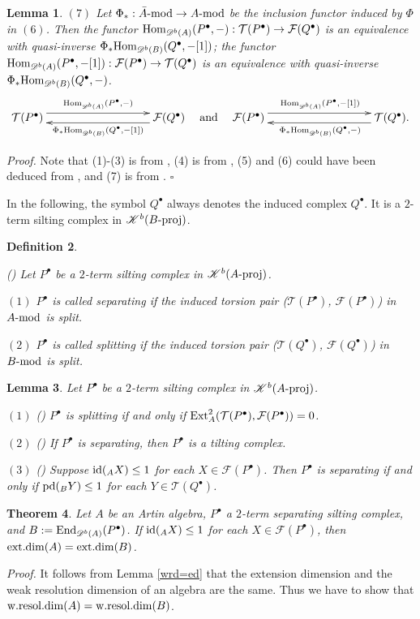 \documentclass[12pt]{article}
\numberwithin{equation}{section}
\newtheorem{Def}{Definition}[section]
\newtheorem{Theo}[Def]{Theorem}
\newtheorem{Lem}[Def]{Lemma}
\theoremstyle{definition}
\newcommand{\End}{{\rm End}}
\def\ed{\mathop{\rm ext.dim}\nolimits}
\def\wrd{\mathop{\rm w.resol.dim}\nolimits}
\newcommand{\pd}{{\rm pd}}
\newcommand{\id}{{\rm id}}
\newcommand{\F}{{\mathcal F}}
\newcommand{\T}{{\mathcal T}}
\newcommand{\Db}[1]{{\mathscr D}^b(#1)}
\newcommand{\Kb}[1]{{\mathscr K}^b(#1)}
\newcommand{\modcat}{\ensuremath{\mbox{{\rm -mod}}}}
\newcommand{\pmodcat}[1]{#1\mbox{{\rm -proj}}}
\newcommand{\Hom}{{\rm Hom}}
\newcommand{\Ext}{{\rm Ext}}
\newcommand{\ra}{\rightarrow}
\begin{document}
\begin{Lem}
$(7)$ Let $\Phi_{\ast}:\bar{A}\modcat\ra A\modcat$ be the inclusion functor induced by $\Phi$ in $(6)$. Then the functor $\Hom_{\Db{A}}(P^{\bullet}, -):\T(P^{\bullet})\ra \F(Q^{\bullet})$ is an equivalence with quasi-inverse $\Phi_{\ast} \Hom_{\Db{B}}(Q^{\bullet}, -[1])$; the functor $\Hom_{\Db{A}}(P^{\bullet}, -[1]):\F(P^{\bullet})\ra \T(Q^{\bullet})$ is an equivalence with quasi-inverse $\Phi_{\ast} \Hom_{\Db{B}}(Q^{\bullet}, -)$.
$$\xymatrix@C=3.2cm{
\T(P^{\bullet})\ar@<1ex>[r]^{\Hom_{\Db{A}}(P^{\bullet}, -)}
&\F(Q^{\bullet})\ar@<1ex>[l]^{\Phi_{\ast} \Hom_{\Db{B}}(Q^{\bullet}, -[1])}
}
\quad\mbox{and}\quad
\xymatrix@C=3.2cm{
\F(P^{\bullet})\ar@<1ex>[r]^{\Hom_{\Db{A}}(P^{\bullet}, -[1])}
&\T(Q^{\bullet}).\ar@<1ex>[l]^{\Phi_{\ast} \Hom_{\Db{B}}(Q^{\bullet}, -)}
}$$



\end{Lem}
{\it Proof.} Note that (1)-(3) is from \cite{HKM02}, (4) is from \cite[Theorem 3.5]{wei13}, (5) and (6) could have been deduced from \cite[Propositions A.3 and A.5]{by13}, and (7) is from \cite[Theorem 1.1]{Buan2016}. $\square$

In the following, the symbol $Q^{\bullet}$ always denotes the induced complex $Q^{\bullet}$. It is a  $2$-term silting complex in $\Kb{\pmodcat{B}}$.

\begin{Def}\label{sep-split}{\rm (\cite[Definition 5.4]{Buan2016})
Let $P^{\bullet}$ be a $2$-term silting complex in $\Kb{\pmodcat{A}}$.

$(1)$ $P^{\bullet}$ is called \emph{separating} if the induced torsion pair ($\T(P^{\bullet})$, $\F(P^{\bullet})$) in $A\modcat$ is split.

$(2)$ $P^{\bullet}$ is called \emph{splitting} if the induced torsion pair ($\T(Q^{\bullet})$, $\F(Q^{\bullet})$) in $B\modcat$ is split.
}\end{Def}

\begin{Lem}\label{sep}
Let $P^{\bullet}$ be a $2$-term silting complex in $\Kb{\pmodcat{A}}$.

$(1)$ {\rm (\cite[Lemma 5.5]{Buan2016})} $P^{\bullet}$ is splitting if and only if $\Ext^{2}_{A}(\T(P^{\bullet}),\F(P^{\bullet}))=0$.

$(2)$ {\rm (\cite[Proposition 5.7]{Buan2016})} If $P^{\bullet}$ is separating, then $P^{\bullet}$ is a tilting complex.

$(3)$ {\rm (\cite[Proposition 3.5]{Hu2021})} Suppose $\id(_AX)\le 1$ for each $X\in \F(P^{\bullet})$. Then $P^{\bullet}$ is separating if and only if $\pd(_BY)\le 1$ for each $Y\in \T(Q^{\bullet})$.
\end{Lem}
\begin{Theo}\label{theo-silt}
Let $A$ be an Artin algebra, $P^{\bullet}$ a $2$-term separating silting complex, and $B:=\End_{\Db{A}}(P^{\bullet})$. If $\id(_AX)\le 1$ for each $X\in \F(P^{\bullet})$, then $\ed(A)=\ed(B)$.
\end{Theo}
{\it Proof.} It follows from Lemma \ref{wrd=ed} that the extension dimension and the weak resolution dimension of an algebra are the same. Thus we have to show that $\wrd(A)=\wrd(B)$.
\end{document}
